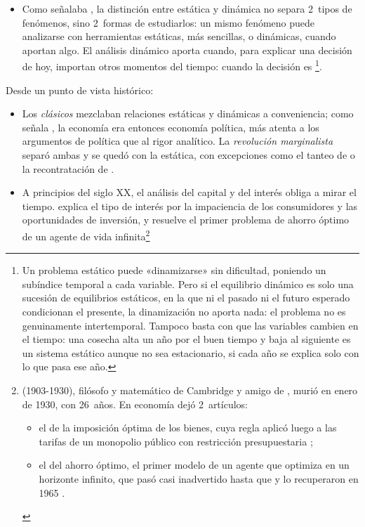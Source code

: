 \documentclass[11pt]{article}
\begin{document}
\begin{itemize}
\begin{itemize}
\begin{itemize}
  \item Como señalaba , la distinción entre estática y dinámica no separa 2~tipos de fenómenos, sino 2~formas de estudiarlos: un mismo fenómeno puede analizarse con herramientas estáticas, más sencillas, o dinámicas, cuando aportan algo. El análisis dinámico aporta cuando, para explicar una decisión de hoy, importan otros momentos del tiempo: cuando la decisión es \footnote{Un problema estático puede «dinamizarse» sin dificultad, poniendo un subíndice temporal a cada variable. Pero si el equilibrio dinámico es solo una sucesión de equilibrios estáticos, en la que ni el pasado ni el futuro esperado condicionan el presente, la dinamización no aporta nada: el problema no es genuinamente intertemporal. Tampoco basta con que las variables cambien en el tiempo: una cosecha alta un año por el buen tiempo y baja al siguiente es un sistema estático aunque no sea estacionario, si cada año se explica solo con lo que pasa ese año\nocite{Samuelson1947Foundations}.}.
  \end{itemize}
  Desde un punto de vista histórico:
  \begin{itemize}
  \item Los \emph{clásicos} mezclaban relaciones estáticas y dinámicas a conveniencia; como señala , la economía era entonces economía política, más atenta a los argumentos de política que al rigor analítico. La \emph{revolución marginalista} separó ambas y se quedó con la estática, con excepciones como el tanteo de  o la recontratación de .
  \item A principios del siglo XX, el análisis del capital y del interés obliga a mirar el tiempo. \textcite{Fisher1930Theory} explica el tipo de interés por la impaciencia de los consumidores y las oportunidades de inversión, y \textcite{Ramsey1928} resuelve el primer problema de ahorro óptimo de un agente de vida infinita\footnote{ (1903-1930), filósofo y matemático de Cambridge y amigo de , murió en enero de 1930, con 26~años\nocite{MacTutorRamseyDeath}. En economía dejó 2~artículos:
\begin{itemize}
\item el de la imposición óptima de los bienes, cuya regla aplicó luego  a las tarifas de un monopolio público con restricción presupuestaria ;
\item el del ahorro óptimo, el primer modelo de un agente que optimiza en un horizonte infinito, que pasó casi inadvertido hasta que  y  lo recuperaron en 1965 .

\end{itemize}}
\end{itemize}
\end{itemize}
\end{itemize}
\end{document}

